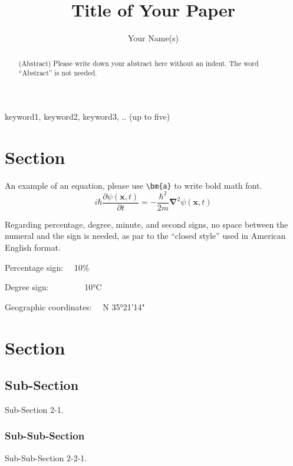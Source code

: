 \documentclass[authorproof,JACIII,researchpaper]{fujipressarticle}
\begin{document}
\pagestyle{fujipressstyle}

\title{Title of Your Paper}
\author{Your Name(s)}
\address{Your Institute(s)\\
	Address(es) of Your Institute\\
	E-mail: Your E-mail address(es)}
\maketitle


\begin{abstract}%
	\noindent (Abstract) Please write down your abstract here without an indent.  The word ``Abstract'' is not needed.  
\end{abstract}

\begin{keywords}
	keyword1, keyword2, keyword3, .. (up to five)
\end{keywords}


\section{Section}
An example of an equation, please use \verb|\bm{a}| to write bold math font.
\begin{equation}
	i \hbar \frac{\partial \psi (\bm{x},t)}{\partial  t} = -\frac{\hbar ^2}{2m}\bm{{\nabla}}^2 \psi (\bm{x},t)
\end{equation}

Regarding percentage, degree, minute, and second signs, no space between the numeral and the sign is needed, as par to the “closed style” used in American English format.\par
  Percentage sign: ~~10\%\par
  Degree sign: ~~~~~~~~10°C\par
  Geographic coordinates: ~~N 35°21'14" \par


\section{Section}
\subsection{Sub-Section}
Sub-Section 2-1.

\subsubsection{Sub-Sub-Section}
Sub-Sub-Section 2-2-1.
\end{document}
